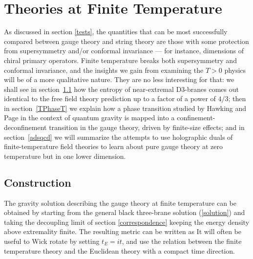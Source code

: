 \section{Theories at Finite Temperature}
\label{FiniteT}

As discussed in section \ref{tests}, 
the quantities that can be most successfully compared between gauge
theory and string theory are those with some protection from
supersymmetry and/or conformal invariance --- for instance, dimensions of
chiral primary operators.  Finite temperature breaks both
supersymmetry and conformal invariance, and the insights we gain from
examining the $T>0$ physics will be of a more qualitative nature.
They are no less interesting for that: we shall see in
section~\ref{ConstT} how the entropy of near-extremal D3-branes comes
out identical to the free field theory prediction up to a factor of
a power of $4/3$; 
then in section~\ref{TPhaseT} we explain how a phase transition
studied by Hawking and Page in the context of quantum gravity is
mapped into a confinement-deconfinement transition in the gauge theory,
driven by finite-size effects; and in section~\ref{adsqcd} we will
summarize the attempts to use holographic duals of finite-temperature
field theories to learn about pure gauge theory at zero temperature
but in one lower dimension.



\subsection{Construction}
\label{ConstT}

The gravity solution describing the gauge theory at finite temperature
can be obtained by starting from the general black three-brane solution
(\ref{solution}) and taking the decoupling limit of section 
\ref{correspondence} keeping the energy density above extremality finite.
The resulting metric can be written as
It will often be useful to Wick rotate by setting $t_E = it$, and use
the relation between the finite temperature theory and the Euclidean
theory with a compact time direction.  

